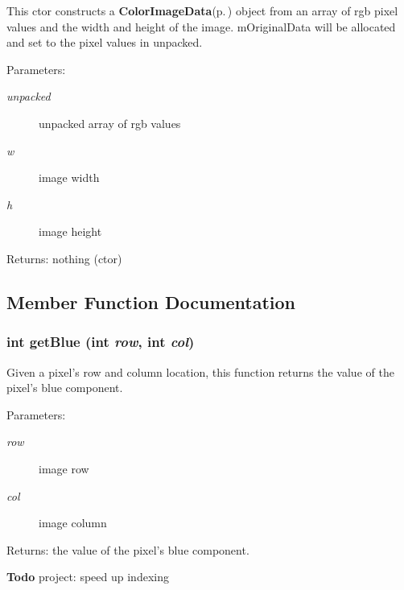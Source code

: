 This ctor constructs a {\bf Color\-Image\-Data}{\rm (p.\,\pageref{class_c_s_image_viewer_1_1_color_image_data})} object from an array of rgb pixel values and the width and height of the image. m\-Original\-Data will be allocated and set to the pixel values in unpacked. 

\begin{Desc}
\item[Parameters:]
\begin{description}
\item[{\em unpacked}]unpacked array of rgb values \item[{\em w}]image width \item[{\em h}]image height \end{description}
\end{Desc}
\begin{Desc}
\item[Returns:]nothing (ctor) \end{Desc}


\subsection{Member Function Documentation}
\subsubsection{\setlength{\rightskip}{0pt plus 5cm}int get\-Blue (int {\em row}, int {\em col})}\label{class_c_s_image_viewer_1_1_color_image_data_2d270d661f5cfa7d4be1e66701b55376}


Given a pixel's row and column location, this function returns the value of the pixel's blue component. 

\begin{Desc}
\item[Parameters:]
\begin{description}
\item[{\em row}]image row \item[{\em col}]image column \end{description}
\end{Desc}
\begin{Desc}
\item[Returns:]the value of the pixel's blue component.\end{Desc}
\begin{Desc}
\item[{\bf Todo}]project: speed up indexing \end{Desc}
